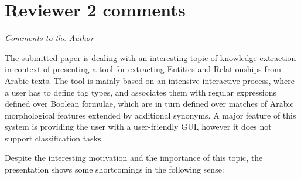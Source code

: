 \section*{Reviewer 2 comments}
\textit{Comments to the Author}



The submitted paper is dealing with an interesting topic 
of knowledge extraction in context of presenting a tool 
for extracting Entities and Relationships from Arabic texts. 
The tool is mainly based on an intensive interactive process, 
where a user has to define tag types, and associates them 
with regular expressions defined over Boolean formulae, 
which are in turn defined over matches of Arabic morphological 
features extended by additional synonyms. 
A major feature of this system is providing the user with a 
user-friendly GUI, however it does not support classification 
tasks.


Despite the interesting motivation and the importance of 
this topic, the presentation shows some shortcomings in the 
following sense:

